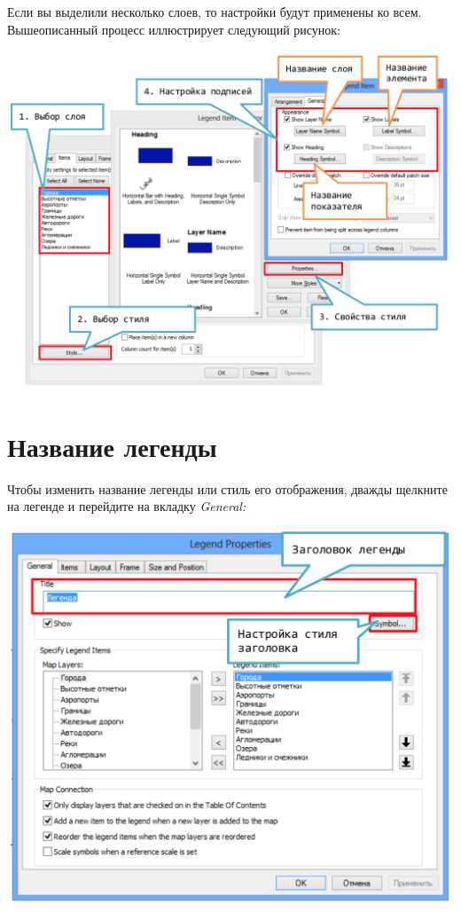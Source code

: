 \documentclass[]{book}
\theoremstyle{definition}
\theoremstyle{definition}
\theoremstyle{definition}
\theoremstyle{remark}
\begin{document}
Если вы выделили несколько слоев, то настройки будут применены ко всем.
Вышеописанный процесс иллюстрирует следующий рисунок:

\includegraphics{images/Appendix/image59.png}

\hypertarget{-}{%
\section{Название легенды}\label{-}}

Чтобы изменить название легенды или стиль его отображения, дважды
щелкните на легенде и перейдите на вкладку \emph{General:}

\includegraphics{images/Appendix/image60.png}
\end{document}

